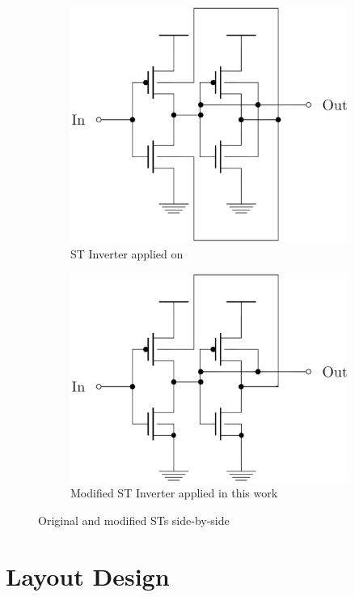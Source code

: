\documentclass[ecp,tc, english]{iiufrgs}
\begin{document}
\begin{figure}[ht]
\centering
\begin{subfigure}{.5\textwidth}
  \centering
  \includegraphics[width=.8\linewidth]{STOriginal.eps}
  \caption{ST Inverter applied on \citet{dokania2015circuit}}
  \label{fig:sub1}
\end{subfigure}%
\begin{subfigure}{.5\textwidth}
  \centering
  \includegraphics[width=.8\linewidth]{STcorrigido.eps}
  \caption{Modified ST Inverter applied in this work}
  \label{fig:sub2}
\end{subfigure}
\caption{Original and modified STs side-by-side}
\label{fig:test}
\end{figure}

\section{Layout Design}
\end{document}
